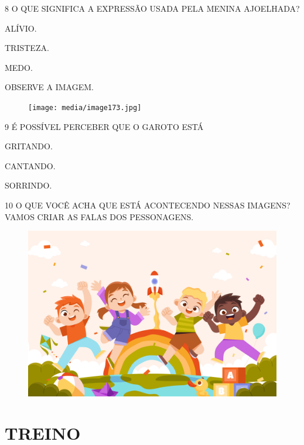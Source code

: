 \num{8} O QUE SIGNIFICA A EXPRESSÃO USADA PELA MENINA AJOELHADA?

\begin{boxlist}
 ALÍVIO.

 TRISTEZA.

 MEDO.
\end{boxlist}

OBSERVE A IMAGEM.

\begin{figure}[htpb!]
\centering
\texttt{[image: media/image173.jpg]}
\end{figure}

\pagebreak

\num{9} É POSSÍVEL PERCEBER QUE O GAROTO ESTÁ

\begin{boxlist}
 GRITANDO. 

 CANTANDO.

 SORRINDO.
\end{boxlist}

\num{10} O QUE VOCÊ ACHA QUE ESTÁ ACONTECENDO NESSAS IMAGENS? VAMOS CRIAR AS FALAS DOS PESSONAGENS.

\begin{figure}[htpb!]
\includegraphics[width=\textwidth]{media/image174.jpg}
\end{figure}


\section{TREINO}

